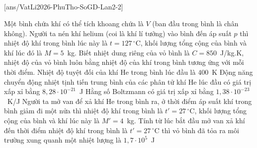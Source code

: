 	\subsection*{}
	\setcounter{ex}{0}
	[ans/VatLi2026-PhuTho-SoGD-Lan2-2]

	\begin{ex}%
		Một bình chứa khí có thể tích khoang chứa là $V$ (ban đầu trong bình là chân không). Người ta nén khí helium (coi là khí lí tưởng) vào bình đến áp suất $p$ thì nhiệt độ khí trong bình lúc này là $t=127\,^\circ\text{C}$, khối lượng tổng cộng của bình và khí lúc đó là $M=5$~kg. Biết nhiệt dung riêng của vỏ bình là $C=850$~J/kg.K, nhiệt độ của vỏ bình luôn bằng nhiệt độ của khí trong bình tương ứng với mỗi thời điểm.
		\choiceTFt
		{\True Nhiệt độ tuyệt đối của khí He trong bình lúc đầu là $400$~K}
		{\True Động năng chuyển động nhiệt tịnh tiến trung bình của các phân tử khí He lúc đầu có giá trị xấp xỉ bằng $8{,}28\cdot 10^{-21}$~J}
		{Hằng số Boltzmann có giá trị xấp xỉ bằng $1{,}38\cdot 10^{-23}$~K/J}
		{\True Người ta mở van để xả khí He trong bình ra, ở thời điểm áp suất khí trong bình giảm đi một nửa thì nhiệt độ khí trong bình là $t'=27\,^\circ\text{C}$, khối lượng tổng cộng của bình và khí lúc này là $M'=4$~kg. Tính từ lúc bắt đầu mở van xả khí đến thời điểm nhiệt độ khí trong bình là $t'=27\,^\circ\text{C}$ thì vỏ bình đã tỏa ra môi trường xung quanh một nhiệt lượng là $1{,}7\cdot 10^5$~J}
	\end{ex}

